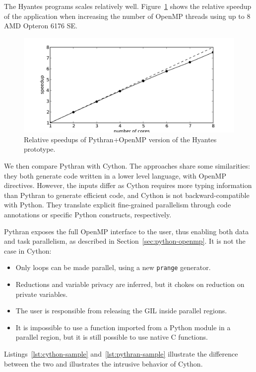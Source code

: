 \documentclass{sigplanconf}
\begin{document}
The Hyantes programs scales relatively well. Figure~\ref{fig:hyantes-speedup} shows
the relative speedup of the application when increasing the number of OpenMP
threads using up to 8 AMD Opteron 6176 SE.

\begin{figure}[ht]
    \caption{Relative speedups of Pythran+OpenMP version of the Hyantes prototype.}
    \label{fig:hyantes-speedup}
    \centering
    \includegraphics[width=.5\textwidth]{hyantes}
\end{figure}

We then compare Pythran with Cython. The approaches share some similarities:
they both generate code written in a lower level language, with OpenMP
directives. However, the inputs differ as Cython requires more typing
information than Pythran to generate efficient code, and Cython is not
backward-compatible with Python. They translate explicit fine-grained
parallelism through code annotations or specific Python constructs,
respectively.

Pythran exposes the full OpenMP interface to the user, thus enabling both data
and task parallelism, as described in Section~\ref{sec:python-openmp}. It is
not the case in Cython:
%
\begin{itemize}

    \item Only loops can be made parallel, using a new \texttt{prange} generator.

    \item Reductions and variable privacy are inferred, but it chokes on
        reduction on private variables.

    \item The user is responsible from releasing the GIL inside parallel
        regions.

    \item It is impossible to use a function imported from a Python module in a
        parallel region, but it is still possible to use native C functions.

\end{itemize}
%
Listings~\ref{lst:cython-sample} and~\ref{lst:pythran-sample} illustrate the
difference between the two and illustrates the intrusive behavior of Cython.
\end{document}
